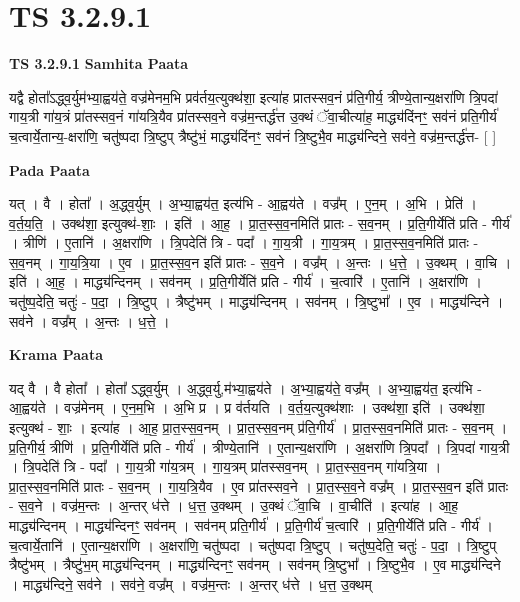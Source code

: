 \documentclass[17pt]{extarticle}
\begin{document}
\section{ TS 3.2.9.1 }

\textbf{TS 3.2.9.1 } \newline
\textbf{Samhita Paata} \newline

यद्वै होता᳚ऽद्ध्व॒र्युम॑भ्या॒ह्वय॑ते॒ वज्र॑मेनम॒भि प्रव॑र्तय॒त्युक्थ॑शा॒ इत्या॑ह प्रातस्सव॒नं प्र॑ति॒गीर्य॒ त्रीण्ये॒तान्य॒क्षरा॑णि त्रि॒पदा॑ गाय॒त्री गा॑य॒त्रं प्रा॑तस्सव॒नं गा॑यत्रि॒यैव प्रा॑तस्सव॒ने वज्र॑म॒न्तर्द्ध॑त्त उ॒क्थं ॅवा॒चीत्या॑ह॒ माद्ध्य॑दिंनꣳ॒॒ सव॑नं प्रति॒गीर्य॑ च॒त्वार्ये॒तान्य॒-क्षरा॑णि॒ चतु॑ष्पदा त्रि॒ष्टुप् त्रैष्टु॑भं॒ माद्ध्य॑दिंनꣳ॒॒ सव॑नं त्रि॒ष्टुभै॒व माद्ध्य॑न्दिने॒ सव॑ने॒ वज्र॑म॒न्तर्द्ध॑त्त-  [  ] \newline

\textbf{Pada Paata} \newline

यत् । वै । होता᳚ । अ॒द्ध्व॒र्युम् । अ॒भ्या॒ह्वय॑त॒ इत्य॑भि - आ॒ह्वय॑ते । वज्र᳚म् । ए॒न॒म् । अ॒भि । प्रेति॑ । व॒र्त॒य॒ति॒ । उक्थ॑शा॒ इत्युक्थ॑-शाः॒ । इति॑ । आ॒ह॒ । प्रा॒त॒स्स॒व॒नमिति॑ प्रातः - स॒व॒नम् । प्र॒ति॒गीर्येति॑ प्रति - गीर्य॑ । त्रीणि॑ । ए॒तानि॑ । अ॒क्षरा॑णि । त्रि॒पदेति॑ त्रि - पदा᳚ । गा॒य॒त्री । गा॒य॒त्रम् । प्रा॒त॒स्स॒व॒नमिति॑ प्रातः - स॒व॒नम् । गा॒य॒त्रि॒या । ए॒व । प्रा॒त॒स्स॒व॒न इति॑ प्रातः - स॒व॒ने । वज्र᳚म् । अ॒न्तः । ध॒त्ते॒ । उ॒क्थम् । वा॒चि । इति॑ । आ॒ह॒ । माद्ध्य॑न्दिनम् । सव॑नम् । प्र॒ति॒गीर्येति॑ प्रति - गीर्य॑ । च॒त्वारि॑ । ए॒तानि॑ । अ॒क्षरा॑णि । चतु॑ष्प॒देति॒ चतुः॑ - प॒दा॒ । त्रि॒ष्टुप् । त्रैष्टु॑भम् । माद्ध्य॑न्दिनम् । सव॑नम् । त्रि॒ष्टुभा᳚ । ए॒व । माद्ध्य॑न्दिने । सव॑ने । वज्र᳚म् । अ॒न्तः । ध॒त्ते॒ ।  \newline


\textbf{Krama Paata} \newline

यद् वै । वै होता᳚ । होता᳚ ऽद्ध्व॒र्युम् । अ॒द्ध्व॒र्यु,म॑भ्या॒ह्वय॑ते । अ॒भ्या॒ह्वय॑ते॒ वज्र᳚म् । अ॒भ्या॒ह्वय॑त॒ इत्य॑भि - आ॒ह्वय॑ते । वज्र॑मेनम् । ए॒न॒म॒भि । अ॒भि प्र । प्र व॑र्तयति । व॒र्त॒य॒त्युक्थ॑शाः । उक्थ॑शा॒ इति॑ । उक्थ॑शा॒ इत्युक्थ॑ - शाः॒ । इत्या॑ह । आ॒ह॒ प्रा॒त॒स्स॒व॒नम् । प्रा॒त॒स्स॒व॒नम् प्र॑ति॒गीर्य॑ । प्रा॒त॒स्स॒व॒नमिति॑ प्रातः - स॒व॒नम् । प्र॒ति॒गीर्य॒ त्रीणि॑ । प्र॒ति॒गीर्येति॑ प्रति - गीर्य॑ । त्रीण्ये॒तानि॑ । ए॒तान्य॒क्षरा॑णि । अ॒क्षरा॑णि त्रि॒पदा᳚ । त्रि॒पदा॑ गाय॒त्री । त्रि॒पदेति॑ त्रि - पदा᳚ । गा॒य॒त्री गा॑य॒त्रम् । गा॒य॒त्रम् प्रा॑तस्सव॒नम् । प्रा॒त॒स्स॒व॒नम् गा॑यत्रि॒या । प्रा॒त॒स्स॒व॒नमिति॑ प्रातः - स॒व॒नम् । गा॒य॒त्रि॒यैव । ए॒व प्रा॑तस्सव॒ने । प्रा॒त॒स्स॒व॒ने वज्र᳚म् । प्रा॒त॒स्स॒व॒न इति॑ प्रातः - स॒व॒ने । वज्र॑म॒न्तः । अ॒न्तर् ध॑त्ते । ध॒त्त॒ उ॒क्थम् । उ॒क्थं ॅवा॒चि । वा॒चीति॑ । इत्या॑ह । आ॒ह॒ माद्ध्य॑न्दिनम् । माद्ध्य॑न्दिनꣳ॒॒ सव॑नम् । सव॑नम् प्रति॒गीर्य॑ । प्र॒ति॒गीर्य॑ च॒त्वारि॑ । प्र॒ति॒गीर्येति॑ प्रति - गीर्य॑ । च॒त्वार्ये॒तानि॑ । ए॒तान्य॒क्षरा॑णि । अ॒क्षरा॑णि॒ चतु॑ष्पदा । चतु॑ष्पदा त्रि॒ष्टुप् । चतु॑ष्प॒देति॒ चतुः॑ - प॒दा॒ । त्रि॒ष्टुप् त्रैष्टु॑भम् । त्रैष्टु॑भ॒म् माद्ध्य॑न्दिनम् । माद्ध्य॑न्दिनꣳ॒॒ सव॑नम् । सव॑नम् त्रि॒ष्टुभा᳚ । त्रि॒ष्टुभै॒व । ए॒व माद्ध्य॑न्दिने । माद्ध्य॑न्दिने॒ सव॑ने । सव॑ने॒ वज्र᳚म् । वज्र॑म॒न्तः । अ॒न्तर् ध॑त्ते । ध॒त्त॒ उ॒क्थम् \newline
\end{document}
